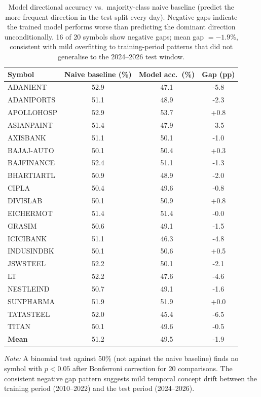 \begin{table}[htbp]
\centering
\caption{%
  Model directional accuracy vs.\ majority-class naive baseline
  (predict the more frequent direction in the test split every day).
  Negative gaps indicate the trained model performs worse than predicting
  the dominant direction unconditionally. 16 of 20 symbols show negative
  gaps; mean gap $= -1.9\%$, consistent with mild overfitting to
  training-period patterns that did not generalise to the 2024--2026
  test window.
}
\label{tab:naive_comparison}
\begin{tabular}{l S[table-format=2.1] S[table-format=2.1] S[table-format=+2.1]}
\toprule
\textbf{Symbol} &
  {\textbf{Naive baseline (\%)}} &
  {\textbf{Model acc.\ (\%)}} &
  {\textbf{Gap (pp)}} \\
\midrule
ADANIENT    & 52.9 & 47.1 & -5.8 \\
ADANIPORTS  & 51.1 & 48.9 & -2.3 \\
APOLLOHOSP  & 52.9 & 53.7 & +0.8 \\
ASIANPAINT  & 51.4 & 47.9 & -3.5 \\
AXISBANK    & 51.1 & 50.1 & -1.0 \\
BAJAJ-AUTO  & 50.1 & 50.4 & +0.3 \\
BAJFINANCE  & 52.4 & 51.1 & -1.3 \\
BHARTIARTL  & 50.9 & 48.9 & -2.0 \\
CIPLA       & 50.4 & 49.6 & -0.8 \\
DIVISLAB    & 50.1 & 50.9 & +0.8 \\
EICHERMOT   & 51.4 & 51.4 & -0.0 \\
GRASIM      & 50.6 & 49.1 & -1.5 \\
ICICIBANK   & 51.1 & 46.3 & -4.8 \\
INDUSINDBK  & 50.1 & 50.6 & +0.5 \\
JSWSTEEL    & 52.2 & 50.1 & -2.1 \\
LT          & 52.2 & 47.6 & -4.6 \\
NESTLEIND   & 50.7 & 49.1 & -1.6 \\
SUNPHARMA   & 51.9 & 51.9 & +0.0 \\
TATASTEEL   & 52.0 & 45.4 & -6.5 \\
TITAN       & 50.1 & 49.6 & -0.5 \\
\midrule
\textbf{Mean} & 51.2 & 49.5 & -1.9 \\
\bottomrule
\end{tabular}

\smallskip
\footnotesize
\textit{Note:} A binomial test against 50\% (not against the naive baseline)
finds no symbol with $p < 0.05$ after Bonferroni correction for 20 comparisons.
The consistent negative gap pattern suggests mild temporal concept drift between
the training period (2010--2022) and the test period (2024--2026).
\end{table}



